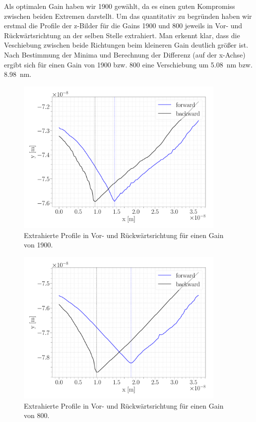 Als optimalen Gain haben wir 1900 gewählt, da es einen guten Kompromiss zwischen beiden Extremen darstellt. Um das quantitativ zu begründen haben wir erstmal die Profile der z-Bilder für die Gains 1900 und 800 jeweils in Vor- und Rückwärtsrichtung an der selben Stelle extrahiert. Man erkennt klar, dass die Veschiebung zwischen beide Richtungen beim kleineren Gain deutlich größer ist. Nach Bestimmung der Minima und Berechnung der Differenz (auf der x-Achse) ergibt sich für einen Gain von 1900 bzw. 800 eine Verschiebung um \SI{5,08}{nm} bzw. \SI{8,98}{nm}.

\begin{figure}[H]
\centering
\includegraphics[width=0.9\textwidth]{../Figures/GAIN_opt_profile.pdf}
\caption{Extrahierte Profile in Vor- und Rückwärtsrichtung für einen Gain von 1900.}
\label{GAIN_opt_profile}
\end{figure}

\begin{figure}[H]
\centering
\includegraphics[width=0.9\textwidth]{../Figures/GAIN_slow_profile.pdf}
\caption{Extrahierte Profile in Vor- und Rückwärtsrichtung für einen Gain von 800.}
\label{GAIN_slow_profile}
\end{figure}

